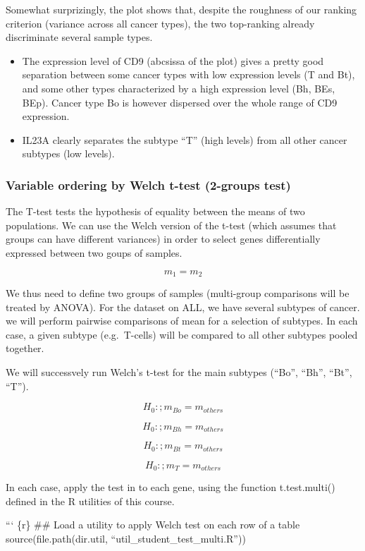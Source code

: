 Somewhat surprizingly, the plot shows that, despite the roughness of our
ranking criterion (variance across all cancer types), the two
top-ranking already discriminate several sample types.

\begin{itemize}
\item
  The expression level of CD9 (abcsissa of the plot) gives a pretty good
  separation between some cancer types with low expression levels (T and
  Bt), and some other types characterized by a high expression level
  (Bh, BEs, BEp). Cancer type Bo is however dispersed over the whole
  range of CD9 expression.
\item
  IL23A clearly separates the subtype ``T'' (high levels) from all other
  cancer subtypes (low levels).
\end{itemize}

\subsubsection{Variable ordering by Welch t-test (2-groups
test)}\label{variable-ordering-by-welch-t-test-2-groups-test}

The T-test tests the hypothesis of equality between the means of two
populations. We can use the Welch version of the t-test (which assumes
that groups can have different variances) in order to select genes
differentially expressed between two goups of samples.

\[m_1 = m_2\]

We thus need to define two groups of samples (multi-group comparisons
will be treated by ANOVA). For the dataset on ALL, we have several
subtypes of cancer. we will perform pairwise comparisons of mean for a
selection of subtypes. In each case, a given subtype (e.g.~T-cells) will
be compared to all other subtypes pooled together.

We will successvely run Welch's t-test for the main subtypes (``Bo'',
``Bh'', ``Bt'', ``T'').

\[H_0:; m_{Bo} = m_{others}\]

\[H_0:; m_{Bh} = m_{others}\]

\[H_0:; m_{Bt} = m_{others}\]

\[H_0:; m_{T} = m_{others}\]

In each case, apply the test in to each gene, using the function
t.test.multi() defined in the {R} utilities of this course.

``` \{r\} \#\# Load a utility to apply Welch test on each row of a table
source(file.path(dir.util, ``util\_student\_test\_multi.R''))

